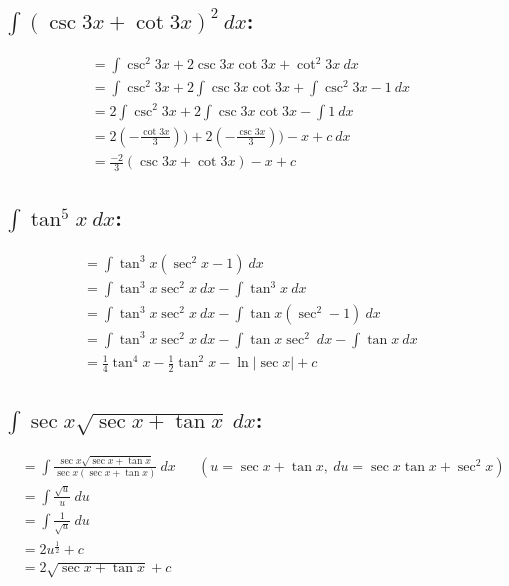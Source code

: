 \documentclass[MathsNotesBase.tex]{subfiles}
\begin{document}
  
  \subsection*{$\int{(\csc{3x} + \cot{3x})^2}\ dx$:}
   
  \begin{align*}
    &= \int{\csc^2{3x} + 2\csc{3x}\cot{3x} + \cot^2{3x}}\ dx && \\[8pt]
    &= \int{\csc^2{3x}} + 2\int{\csc{3x}\cot{3x}} + \int{\csc^2{3x} - 1}\ dx && \\[8pt]
    &= 2\int{\csc^2{3x}} + 2\int{\csc{3x}\cot{3x}} - \int{1}\ dx && \\[8pt]
    &= 2(-\frac{\cot{3x}}{3})) + 2(-\frac{\csc{3x}}{3})) - x + c\ dx && \\[8pt]
    &= \frac{-2}{3}(\csc{3x} + \cot{3x}) - x + c
  \end{align*}
  
  
  \subsection*{$\int{\tan^5{x}}\ dx$:}
   
  \begin{align*}
    &= \int{\tan^3{x}(\sec^2{x} - 1)}\ dx && \\[8pt]
    &= \int{\tan^3{x}\sec^2{x}}\ dx - \int{\tan^3{x}}\ dx && \\[8pt]
    &= \int{\tan^3{x}\sec^2{x}}\ dx - \int{\tan{x}(\sec^2 - 1)}\ dx && \\[8pt]
    &= \int{\tan^3{x}\sec^2{x}}\ dx - \int{\tan{x}\sec^2}\ dx - \int{\tan{x}}\ dx && \\[8pt]
    &= \frac{1}{4}\tan^4{x} - \frac{1}{2}\tan^2{x} - \ln{\lvert\sec{x}\rvert} + c
  \end{align*}
  
  
  \subsection*{$\int{\sec{x}\sqrt{\sec{x} + \tan{x}}}\ dx$:}
   
  \begin{align*}
    &= \int{\frac{\sec{x}\sqrt{\sec{x} + \tan{x}}}{\sec{x}(\sec{x} + \tan{x})}}\ dx && (u = \sec{x} + \tan{x},\ du = \sec{x}\tan{x} + \sec^2{x})  \\[8pt]
    &= \int{\frac{\sqrt{u}}{u}}\ du \\[8pt]
    &= \int{\frac{1}{\sqrt{u}}}\ du \\[8pt]
    &= 2u^{\frac{1}{2}} + c \\[8pt]
    &= 2\sqrt{\sec{x} + \tan{x}} + c
  \end{align*}
  
\end{document}
